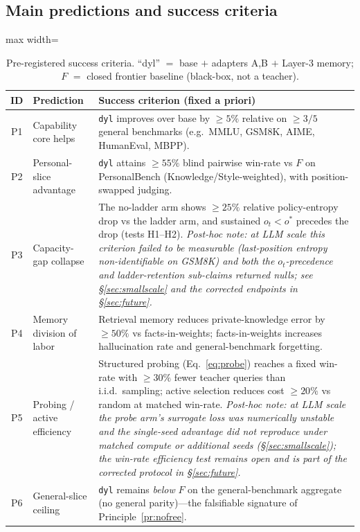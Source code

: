 \documentclass[11pt]{article}
\begin{document}
\subsection{Main predictions and success criteria}
\begin{table}[h]
\centering
\caption{Pre-registered success criteria. ``dyl'' $=$ base $+$ adapters A,B $+$ Layer-3 memory; $F$ $=$ closed frontier baseline (black-box, not a teacher).}
\label{tab:criteria}
\small
\begin{adjustbox}{max width=\linewidth}
\begin{tabular}{@{}clp{8.6cm}@{}}
\toprule
\textbf{ID} & \textbf{Prediction} & \textbf{Success criterion (fixed a priori)} \\
\midrule
P1 & Capability core helps & \texttt{dyl} improves over base by $\ge 5\%$ relative on $\ge 3/5$ general benchmarks (e.g.\ MMLU, GSM8K, AIME, HumanEval, MBPP). \\
P2 & Personal-slice advantage & \texttt{dyl} attains $\ge 55\%$ blind pairwise win-rate vs $F$ on PersonalBench (Knowledge/Style-weighted), with position-swapped judging. \\
P3 & Capacity-gap collapse & The no-ladder arm shows $\ge 25\%$ relative policy-entropy drop vs the ladder arm, and sustained $o_t<o^\ast$ precedes the drop (tests H1--H2). \emph{Post-hoc note: at LLM scale this criterion failed to be measurable (last-position entropy non-identifiable on GSM8K) and both the $o_t$-precedence and ladder-retention sub-claims returned nulls; see \S\ref{sec:smallscale} and the corrected endpoints in \S\ref{sec:future}.} \\
P4 & Memory division of labor & Retrieval memory reduces private-knowledge error by $\ge 50\%$ vs facts-in-weights; facts-in-weights increases hallucination rate and general-benchmark forgetting. \\
P5 & Probing / active efficiency & Structured probing (Eq.~\eqref{eq:probe}) reaches a fixed win-rate with $\ge 30\%$ fewer teacher queries than i.i.d.\ sampling; active selection reduces cost $\ge 20\%$ vs random at matched win-rate. \emph{Post-hoc note: at LLM scale the probe arm's surrogate loss was numerically unstable and the single-seed advantage did not reproduce under matched compute or additional seeds (\S\ref{sec:smallscale}); the win-rate efficiency test remains open and is part of the corrected protocol in \S\ref{sec:future}.} \\
P6 & General-slice ceiling & \texttt{dyl} remains \emph{below} $F$ on the general-benchmark aggregate (no general parity)---the falsifiable signature of Principle~\ref{pr:nofree}. \\
\bottomrule
\end{tabular}
\end{adjustbox}
\end{table}
\end{document}
